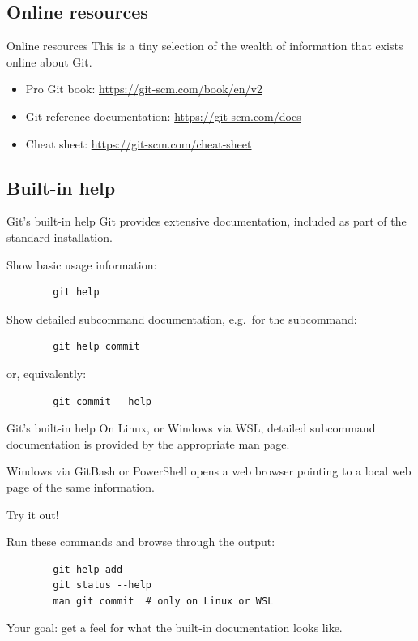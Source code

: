 \documentclass{git_course}
\begin{document}
\subsection{Online resources}

\begin{frame}[fragile]{Online resources}
    This is a tiny selection of the wealth of information that exists online
    about Git.
    \begin{itemize}
        \item Pro Git book: \url{https://git-scm.com/book/en/v2}
        \item Git reference documentation: \url{https://git-scm.com/docs}
        \item Cheat sheet: \url{https://git-scm.com/cheat-sheet}
    \end{itemize}
\end{frame}

\subsection{Built-in help}

\begin{frame}[fragile]{Git's built-in help}
    Git provides extensive documentation, included as part of the standard
    installation.

    Show basic usage information:
    \begin{verbatim}
        git help
    \end{verbatim}

    Show detailed subcommand documentation, e.g.\ for the 
    subcommand:
    \begin{verbatim}
        git help commit
    \end{verbatim}

    or, equivalently:
    \begin{verbatim}
        git commit --help
    \end{verbatim}
\end{frame}

\begin{frame}[fragile]{Git's built-in help}
    On Linux, or Windows via WSL, detailed subcommand documentation is
    provided by the appropriate man page.

    Windows via GitBash or PowerShell opens a web browser pointing to a
    local web page of the same information.

    Try it out!

    Run these commands and browse through the output:
    \begin{verbatim}
        git help add
        git status --help
        man git commit  # only on Linux or WSL
    \end{verbatim}
    Your goal: get a feel for what the built-in documentation looks like.
\end{frame}
\end{document}
